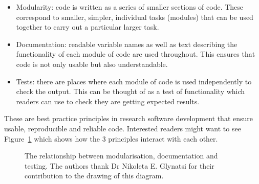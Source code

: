 \begin{itemize}
        \item Modularity: code is written as a
              series of smaller sections of code. These correspond to smaller,
              simpler, individual tasks (modules) that can be used together to carry out
              a particular larger task.
        \item Documentation: readable variable names as
              well as
              text describing the functionality of each module of code are used
              throughout. This ensures that code is not only usable but also
              understandable.
          \item Tests: there are places where each module of code is
              used independently to check the output. This can be thought of as a
              test of functionality which readers can use to check they are
              getting expected results.
\end{itemize}

These are best practice principles in research software development
that ensure usable, reproducible and reliable code\autocite{wilson2014best}.
Interested readers might want to see Figure~\ref{fig:rsd-triangle} which shows
how the 3 principles interact with each other.

\begin{figure}
    \begin{center}
        
        \caption{The relationship between modularisation, documentation and
            testing. The authors thank Dr Nikoleta E. Glynatsi for their contribution to
            the drawing of this diagram.}
        \label{fig:rsd-triangle}
    \end{center}
\end{figure}

